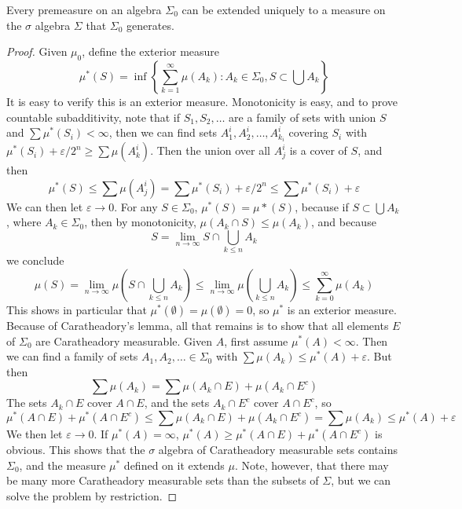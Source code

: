 \begin{theorem}
    Every premeasure on an algebra $\Sigma_0$ can be extended uniquely to a measure on the $\sigma$ algebra $\Sigma$ that $\Sigma_0$ generates.
\end{theorem}
\begin{proof}
    Given $\mu_0$, define the exterior measure
    \[ \mu^*(S) = \inf \left\{ \sum_{k = 1}^\infty \mu(A_k) : A_k \in \Sigma_0, S \subset \bigcup A_k \right\} \]
    It is easy to verify this is an exterior measure. Monotonicity is easy, and to prove countable subadditivity, note that if $S_1, S_2, \dots$ are a family of sets with union $S$ and $\sum \mu^*(S_i) < \infty$, then we can find sets $A^i_1, A^i_2, \dots, A^i_{k_i}$ covering $S_i$ with $\mu^*(S_i) + \varepsilon/2^n \geq \sum \mu(A^i_k)$. Then the union over all $A^i_j$ is a cover of $S$, and then
    \[ \mu^*(S) \leq \sum \mu(A^i_j) = \sum \mu^*(S_i) + \varepsilon/2^n \leq \sum \mu^*(S_i) + \varepsilon \]
    We can then let $\varepsilon \to 0$. For any $S \in \Sigma_0$, $\mu^*(S) = \mu*(S)$, because if $S \subset \bigcup A_k$, where $A_k \in \Sigma_0$, then by monotonicity, $\mu(A_k \cap S) \leq \mu(A_k)$, and because
    \[ S = \lim_{n \to \infty} S \cap \bigcup_{k \leq n} A_k \]
    we conclude
    \[ \mu(S) = \lim_{n \to \infty} \mu \left( S \cap \bigcup_{k \leq n} A_k \right) \leq \lim_{n \to \infty} \mu \left( \bigcup_{k \leq n} A_k \right) \leq \sum_{k = 0}^\infty \mu(A_k) \]
    This shows in particular that $\mu^*(\emptyset) = \mu(\emptyset) = 0$, so $\mu^*$ is an exterior measure. Because of Caratheadory's lemma, all that remains is to show that all elements $E$ of $\Sigma_0$ are Caratheadory measurable. Given $A$, first assume $\mu^*(A) < \infty$. Then we can find a family of sets $A_1, A_2, \dots \in \Sigma_0$ with $\sum \mu(A_k) \leq \mu^*(A) + \varepsilon$. But then
    \[ \sum \mu(A_k) = \sum \mu(A_k \cap E) + \mu(A_k \cap E^c) \]
    The sets $A_k \cap E$ cover $A \cap E$, and the sets $A_k \cap E^c$ cover $A \cap E^c$, so
    \[ \mu^*(A \cap E) + \mu^*(A \cap E^c) \leq \sum \mu(A_k \cap E) + \mu(A_k \cap E^c) = \sum \mu(A_k) \leq \mu^*(A) + \varepsilon \]
    We then let $\varepsilon \to 0$. If $\mu^*(A) = \infty$, $\mu^*(A) \geq \mu^*(A \cap E) + \mu^*(A \cap E^c)$ is obvious. This shows that the $\sigma$ algebra of Caratheadory measurable sets contains $\Sigma_0$, and the measure $\mu^*$ defined on it extends $\mu$. Note, however, that there may be many more Caratheadory measurable sets than the subsets of $\Sigma$, but we can solve the problem by restriction.
\end{proof}

